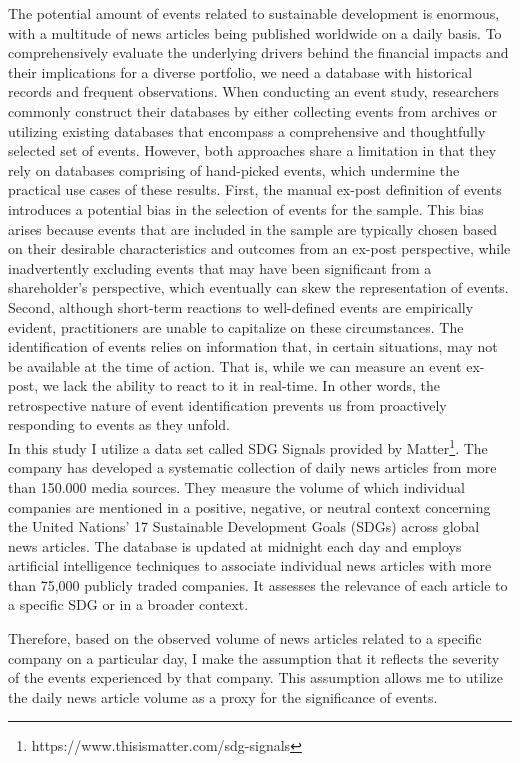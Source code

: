 The potential amount of events related to sustainable development is enormous, with a multitude of news articles being published worldwide on a daily basis. To comprehensively evaluate the underlying drivers behind the financial impacts and their implications for a diverse portfolio, we need a database with historical records and frequent observations. When conducting an event study, researchers commonly construct their databases by either collecting events from archives or utilizing existing databases that encompass a comprehensive and thoughtfully selected set of events. However, both approaches share a limitation in that they rely on databases comprising of hand-picked events, which undermine the practical use cases of these results. First, the manual ex-post definition of events introduces a potential bias in the selection of events for the sample. This bias arises because events that are included in the sample are typically chosen based on their desirable characteristics and outcomes from an ex-post perspective, while inadvertently excluding events that may have been significant from a shareholder's perspective, which eventually can skew the representation of events. Second, although short-term reactions to well-defined events are empirically evident, practitioners are unable to capitalize on these circumstances. The identification of events relies on information that, in certain situations, may not be available at the time of action. That is, while we can measure an event ex-post, we lack the ability to react to it in real-time. In other words, the retrospective nature of event identification prevents us from proactively responding to events as they unfold. \\

In this study I utilize a data set called SDG Signals provided by Matter\footnote{ https://www.thisismatter.com/sdg-signals}. The company has developed a systematic collection of daily news articles from more than 150.000 media sources. They measure the volume of which individual companies are mentioned in a positive, negative, or neutral context concerning the United Nations' 17 Sustainable Development Goals (SDGs) across global news articles. The database is updated at midnight each day and employs artificial intelligence techniques to associate individual news articles with more than 75,000 publicly traded companies. It assesses the relevance of each article to a specific SDG or in a broader context. 

Therefore, based on the observed volume of news articles related to a specific company on a particular day, I make the assumption that it reflects the severity of the events experienced by that company. This assumption allows me to utilize the daily news article volume as a proxy for the significance of events.

